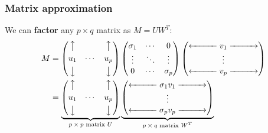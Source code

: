 \documentclass[smaller]{beamer}
\begin{document}
\begin{frame}
\frametitle{Matrix approximation}

We can {\bf factor} any $p \times q$ matrix as $M = UW^T$:
\begin{align*}
M
&= 
\begin{pmatrix}
\big\uparrow    &         & \big\uparrow \\[.05in]
u_1             &  \cdots & u_p  \\[.05in]
\big\downarrow  &         & \big\downarrow
\end{pmatrix}
\begin{pmatrix}
\sigma_1  & \cdots & 0       \\
\vdots    & \ddots & \vdots  \\
0         & \cdots & \sigma_p            
\end{pmatrix}
\begin{pmatrix} 
\xleftarrow{\hspace*{1cm}} v_1 \xrightarrow{\hspace*{1cm}} \\
\vdots \\
\xleftarrow{\hspace*{1cm}} v_p \xrightarrow{\hspace*{1cm}} 
\end{pmatrix} \\
&=
\underbrace{\begin{pmatrix}
\big\uparrow    &         & \big\uparrow \\[.05in]
u_1             &  \cdots & u_p  \\[.05in]
\big\downarrow  &         & \big\downarrow
\end{pmatrix}}_{\text{$p \times p$ matrix $U$}}
\underbrace{\begin{pmatrix} 
\xleftarrow{\hspace*{1cm}} \sigma_1 v_1 \xrightarrow{\hspace*{1cm}} \\
\vdots \\
\xleftarrow{\hspace*{1cm}} \sigma_p v_p \xrightarrow{\hspace*{1cm}} 
\end{pmatrix}}_{\text{$p \times q$ matrix $W^T$}}
\end{align*}


\end{frame}
\end{document}
